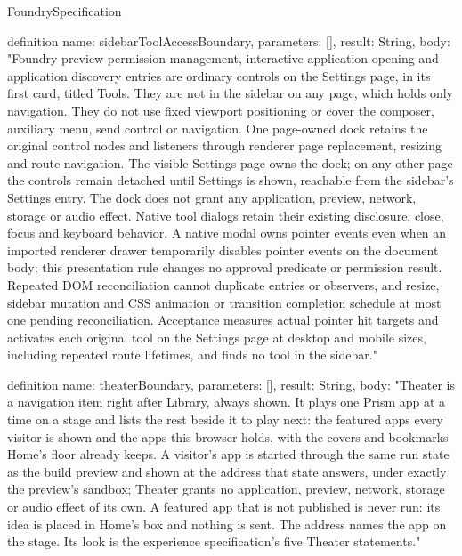 \begin{lexlean}{FoundrySpecification}
\begin{semanticmodule}
definition{
  name: sidebarToolAccessBoundary,
  parameters: [],
  result: String,
  body: "Foundry preview permission management, interactive application opening and application discovery entries are ordinary controls on the Settings page, in its first card, titled Tools. They are not in the sidebar on any page, which holds only navigation. They do not use fixed viewport positioning or cover the composer, auxiliary menu, send control or navigation. One page-owned dock retains the original control nodes and listeners through renderer page replacement, resizing and route navigation. The visible Settings page owns the dock; on any other page the controls remain detached until Settings is shown, reachable from the sidebar's Settings entry. The dock does not grant any application, preview, network, storage or audio effect. Native tool dialogs retain their existing disclosure, close, focus and keyboard behavior. A native modal owns pointer events even when an imported renderer drawer temporarily disables pointer events on the document body; this presentation rule changes no approval predicate or permission result. Repeated DOM reconciliation cannot duplicate entries or observers, and resize, sidebar mutation and CSS animation or transition completion schedule at most one pending reconciliation. Acceptance measures actual pointer hit targets and activates each original tool on the Settings page at desktop and mobile sizes, including repeated route lifetimes, and finds no tool in the sidebar."
}

definition{
  name: theaterBoundary,
  parameters: [],
  result: String,
  body: "Theater is a navigation item right after Library, always shown. It plays one Prism app at a time on a stage and lists the rest beside it to play next: the featured apps every visitor is shown and the apps this browser holds, with the covers and bookmarks Home's floor already keeps. A visitor's app is started through the same run state as the build preview and shown at the address that state answers, under exactly the preview's sandbox; Theater grants no application, preview, network, storage or audio effect of its own. A featured app that is not published is never run: its idea is placed in Home's box and nothing is sent. The address names the app on the stage. Its look is the experience specification's five Theater statements."
}


\end{semanticmodule}
\end{lexlean}
